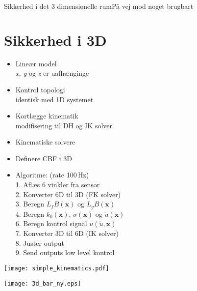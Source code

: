 \begin{frame}{Sikkerhed i det 3 dimensionelle rum}{På vej mod noget brugbart}
\section{Sikkerhed i 3D}
\begin{minipage}{0.45\textwidth}
\vspace*{0.5cm}
\begin{itemize}
	\item Lineær model \\
	\scriptsize  \textit{x, y} og \textit{z} er uafhænginge
	\item \normalsize Kontrol topologi \\
	\scriptsize identisk med 1D systemet
	\item \normalsize Kortlægge kinematik \\
	\scriptsize modifisering til DH og IK solver 
	\item \normalsize Kinematiske solvere
	\item Definere CBF i 3D
\end{itemize}
\vspace*{-0.5cm}
\end{minipage}
\begin{minipage}{0.45\textwidth}
\vspace{0.6cm}
\begin{itemize}
	\item Algoritme: (rate 100\,Hz)\vspace{0.1cm}\\
	\scriptsize 1. Aflæs 6 vinkler fra sensor \\
	\scriptsize 2. Konverter 6D til 3D (FK solver) \\
	\scriptsize 3. Beregn $L_fB(\textbf{x})$ og $L_gB(\textbf{x})$ \\
	\scriptsize 4. Beregn $k_0(\textbf{x})$, $\sigma(\textbf{x})$ og $\tilde{u}(\textbf{x})$ \\
	\scriptsize 6. Beregn kontrol signal $u(\tilde{u},\textbf{x})$ \\
	\scriptsize 7. Konverter 3D til 6D (IK solver) \\
	\scriptsize 8. Juster output \\
	\scriptsize 9. Send outputs low level kontrol
\end{itemize}
\end{minipage}
\begin{minipage}{0.45\textwidth}
\texttt{[image: simple\_kinematics.pdf]}
\end{minipage}
\hspace*{0.8cm}
\begin{minipage}{0.45\textwidth}
\texttt{[image: 3d\_bar\_ny.eps]}
\end{minipage}
\end{frame}

